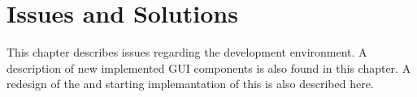 
\chapter{Issues and Solutions}


This chapter describes issues regarding the development environment.  A description of new implemented GUI components is also found in this chapter. A redesign of the \ct and starting implemantation of this is also described here.









